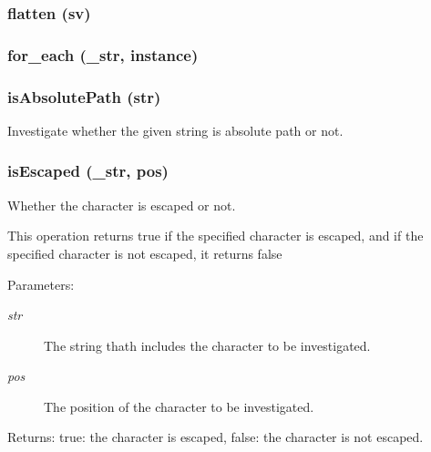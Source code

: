 \subsubsection{\setlength{\rightskip}{0pt plus 5cm}flatten (sv)}\label{StringUtil_8py_a15}


\subsubsection{\setlength{\rightskip}{0pt plus 5cm}for\_\-each (\_\-str, instance)}\label{StringUtil_8py_a1}


\subsubsection{\setlength{\rightskip}{0pt plus 5cm}is\-Absolute\-Path (str)}\label{StringUtil_8py_a9}


Investigate whether the given string is absolute path or not. 

\subsubsection{\setlength{\rightskip}{0pt plus 5cm}is\-Escaped (\_\-str, pos)}\label{StringUtil_8py_a0}


Whether the character is escaped or not. 

This operation returns true if the specified character is escaped, and if the specified character is not escaped, it returns false

\begin{Desc}
\item[Parameters:]
\begin{description}
\item[{\em str}]The string thath includes the character to be investigated. \item[{\em pos}]The position of the character to be investigated. \end{description}
\end{Desc}
\begin{Desc}
\item[Returns:]true: the character is escaped, false: the character is not escaped.\end{Desc}
